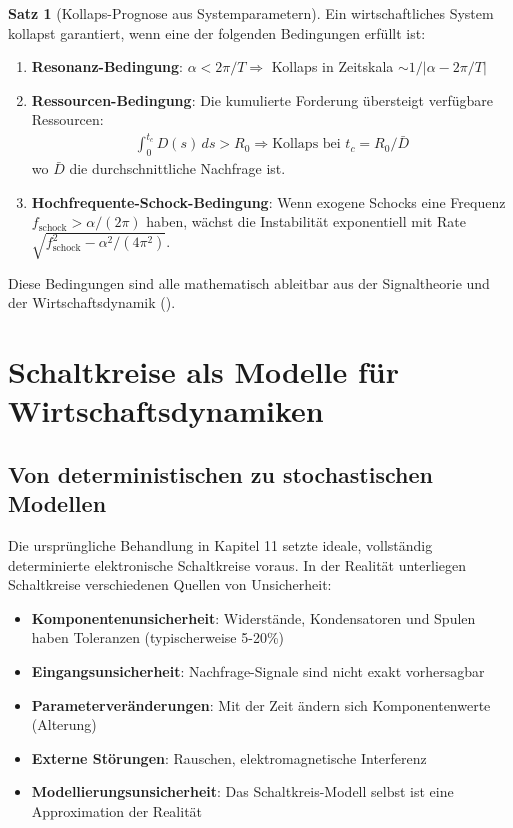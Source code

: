 \documentclass[a4paper, 12pt, twoside, openright]{report}
\theoremstyle{definition}
\theoremstyle{definition}
\newtheorem{satz}{Satz}[chapter]
\begin{document}
\begin{satz}[Kollaps-Prognose aus Systemparametern]

Ein wirtschaftliches System kollapst garantiert, wenn eine der folgenden Bedingungen erfüllt ist:

\begin{enumerate}

\item \textbf{Resonanz-Bedingung}: $\alpha < 2\pi / T \Rightarrow$ Kollaps in Zeitskala $\sim 1/|\alpha - 2\pi/T|$

\item \textbf{Ressourcen-Bedingung}: Die kumulierte Forderung übersteigt verfügbare Ressourcen:
\begin{align}
\int_0^{t_c} D(s) \, ds > R_0 \Rightarrow \text{Kollaps bei } t_c = R_0 / \bar{D}
\end{align}
wo $\bar{D}$ die durchschnittliche Nachfrage ist.

\item \textbf{Hochfrequente-Schock-Bedingung}: Wenn exogene Schocks eine Frequenz $f_{\text{schock}} > \alpha/(2\pi)$ haben, wächst die Instabilität exponentiell mit Rate $\sqrt{f_{\text{schock}}^2 - \alpha^2/(4\pi^2)}$.

\end{enumerate}

Diese Bedingungen sind alle mathematisch ableitbar aus der Signaltheorie und der Wirtschaftsdynamik (\cite{epp_signal}).

\end{satz}

\section{Schaltkreise als Modelle für Wirtschaftsdynamiken}

\subsection{Von deterministischen zu stochastischen Modellen}

Die ursprüngliche Behandlung in Kapitel 11 setzte ideale, vollständig determinierte elektronische Schaltkreise voraus. In der Realität unterliegen Schaltkreise verschiedenen Quellen von Unsicherheit:

\begin{itemize}
    \item \textbf{Komponentenunsicherheit}: Widerstände, Kondensatoren und Spulen haben Toleranzen (typischerweise 5-20\%)
    \item \textbf{Eingangsunsicherheit}: Nachfrage-Signale sind nicht exakt vorhersagbar
    \item \textbf{Parameterveränderungen}: Mit der Zeit ändern sich Komponentenwerte (Alterung)
    \item \textbf{Externe Störungen}: Rauschen, elektromagnetische Interferenz
    \item \textbf{Modellierungsunsicherheit}: Das Schaltkreis-Modell selbst ist eine Approximation der Realität
\end{itemize}
\end{document}
